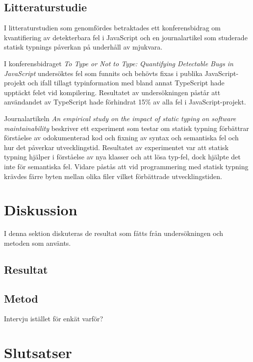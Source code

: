 \subsection{Litteraturstudie}
I litteraturstudien som genomfördes betraktades ett konferensbidrag om kvantifiering av detekterbara fel i JavaScript och en journalartikel som studerade statisk typnings påverkan på underhåll av mjukvara.

I konferensbidraget \textit{To Type or Not to Type:
Quantifying Detectable Bugs in JavaScript} \cite{henrik_totypeornot} undersöktes fel som funnits och behövts fixas i publika JavaScript-projekt och ifall tillagt typinformation med bland annat TypeScript hade upptäckt felet vid kompilering. 
Resultatet av undersökningen påstår att användandet av TypeScript hade förhindrat 15\% av alla fel i JavaScript-projekt.

Journalartikeln \textit{An empirical study on the impact of static typing
on software maintainability} \cite{henrik_maintainability} beskriver ett experiment som testar om statisk typning förbättrar förståelse av odokumenterad kod och fixning av syntax och semantiska fel och hur det påverkar utvecklingstid.
Resultatet av experimentet var att statisk typning hjälper i förståelse av nya klasser och att lösa typ-fel, dock hjälpte det inte för semantiska fel. Vidare påstås att vid programmering med statisk typning krävdes färre byten mellan olika filer vilket förbättrade utvecklingstiden.


\section{Diskussion}
I denna sektion diskuteras de resultat som fåtts från undersökningen och metoden som använts.
\subsection{Resultat}
\subsection{Metod}
Intervju istället för enkät varför?
\section{Slutsatser}


